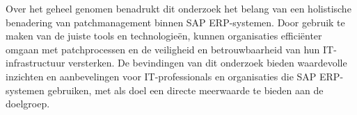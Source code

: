 Over het geheel genomen benadrukt dit onderzoek het belang van een holistische benadering van patchmanagement binnen SAP ERP-systemen. Door gebruik te maken van de juiste tools en technologieën, kunnen organisaties efficiënter omgaan met patchprocessen 
en de veiligheid en betrouwbaarheid van hun IT-infrastructuur versterken. De bevindingen van dit onderzoek bieden waardevolle inzichten en aanbevelingen voor IT-professionals en organisaties die SAP ERP-systemen gebruiken, met als doel een directe meerwaarde te bieden aan de doelgroep.
